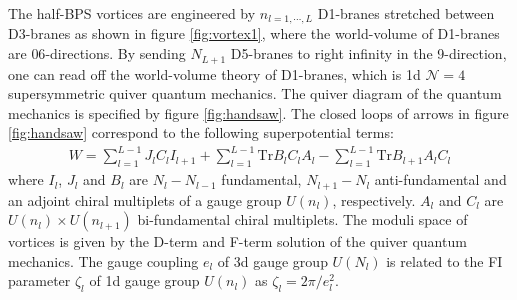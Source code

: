 \documentclass[a4paper,11pt]{article}
\begin{document}
The half-BPS vortices are engineered by $n_{l=1, \cdots, L}$ D1-branes stretched between D3-branes as shown in figure \ref{fig:vortex1}, where the world-volume of D1-branes are $06$-directions.
By sending $N_{L+1}$ D5-branes to right infinity in the 9-direction, one can read off the world-volume theory of D1-branes, which is 1d $\mathcal{N}=4$ supersymmetric quiver quantum mechanics. The quiver diagram of the quantum mechanics is specified by figure \ref{fig:handsaw}.
The closed loops of arrows in figure \ref{fig:handsaw} correspond to the following superpotential terms:
\begin{eqnarray}
W=\sum_{l=1}^{L-1} J_l C_{l} I_{l+1}+\sum_{l=1}^{L-1} \mathrm{Tr} B_{l} C_l A_l- \sum_{l=1}^{L-1} \mathrm{Tr} B_{l+1} A_l C_l
\end{eqnarray}
where $I_l$, $J_l$ and $B_l$ are $N_{l}-N_{l-1}$ fundamental, $N_{l+1}-N_{l}$ anti-fundamental and an adjoint chiral multiplets of a gauge group $U(n_l)$, respectively. $A_{l}$ and $C_{l}$ are $U(n_l) \times U(n_{l+1})$ bi-fundamental chiral multiplets. The moduli space of vortices is given by the D-term and F-term solution of the quiver quantum mechanics.
The gauge coupling $e_l$ of 3d gauge group $U(N_l)$ is related to the FI parameter $\zeta_l$ of 1d gauge group $U(n_l)$ as
$\zeta_l ={2 \pi }/{e^{2}_l} $.
\end{document}

